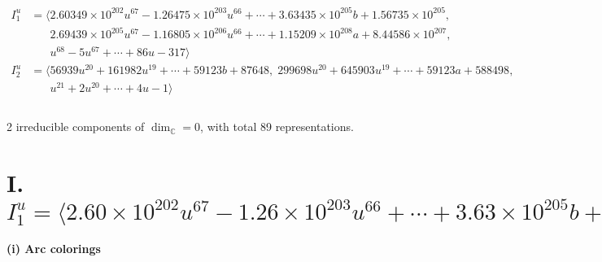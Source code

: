 \documentclass[1p]{elsarticle_modified}
\theoremstyle{definition}
\begin{document}
\begin{align*}
I^u_{1}&=\langle 
2.60349\times10^{202} u^{67}-1.26475\times10^{203} u^{66}+\cdots+3.63435\times10^{205} b+1.56735\times10^{205},\\
\phantom{I^u_{1}}&\phantom{= \langle  }2.69439\times10^{205} u^{67}-1.16805\times10^{206} u^{66}+\cdots+1.15209\times10^{208} a+8.44586\times10^{207},\\
\phantom{I^u_{1}}&\phantom{= \langle  }u^{68}-5 u^{67}+\cdots+86 u-317\rangle \\
I^u_{2}&=\langle 
56939 u^{20}+161982 u^{19}+\cdots+59123 b+87648,\;299698 u^{20}+645903 u^{19}+\cdots+59123 a+588498,\\
\phantom{I^u_{2}}&\phantom{= \langle  }u^{21}+2 u^{20}+\cdots+4 u-1\rangle \\
\\
\end{align*}
\raggedright * 2 irreducible components of $\dim_{\mathbb{C}}=0$, with total 89 representations.\\
\newpage
\renewcommand{\arraystretch}{1}
\centering \section*{I. $I^u_{1}= \langle 2.60\times10^{202} u^{67}-1.26\times10^{203} u^{66}+\cdots+3.63\times10^{205} b+1.57\times10^{205},\;2.69\times10^{205} u^{67}-1.17\times10^{206} u^{66}+\cdots+1.15\times10^{208} a+8.45\times10^{207},\;u^{68}-5 u^{67}+\cdots+86 u-317 \rangle$}
\flushleft \textbf{(i) Arc colorings}\\
\end{document}

